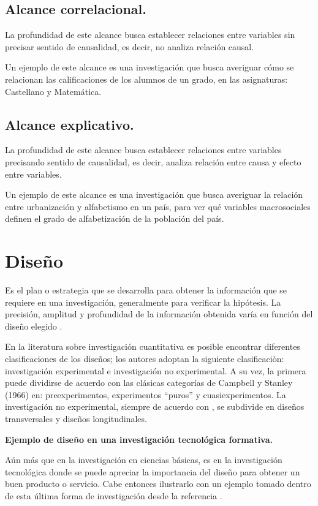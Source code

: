 \subsection{Alcance correlacional.}
La profundidad de este alcance busca establecer relaciones entre variables sin precisar sentido de causalidad, es decir, no analiza relación causal.

Un ejemplo de este alcance es una investigación que busca averiguar cómo se relacionan las calificaciones de los alumnos de un grado, en las asignaturas: Castellano y Matemática.

\subsection{Alcance explicativo.}
La profundidad de este alcance busca establecer relaciones entre variables precisando sentido de causalidad, es decir, analiza relación entre causa y efecto entre variables.

Un ejemplo de este alcance es una investigación que busca averiguar la relación entre urbanización y alfabetismo en un país, para ver qué variables macrosociales definen el grado de alfabetización de la población del país.

\section{Diseño}
Es el plan o estrategia que se desarrolla para obtener la información que se requiere en una investigación, generalmente para verificar la hipótesis. La precisión, amplitud y profundidad de la información obtenida varía en función del diseño elegido \cite{sampieri}.

En la literatura sobre investigación cuantitativa es posible encontrar diferentes clasificaciones de los diseños; los autores \cite{sampieri} adoptan la siguiente clasificaciòn: investigación experimental e investigación no experimental. A su vez, la primera puede dividirse de acuerdo con las clásicas categorías de Campbell y Stanley (1966) en: preexperimentos, experimentos ``puros'' y cuasiexperimentos. La investigación no experimental, siempre de acuerdo con \cite{sampieri}, se subdivide en diseños transversales y diseños longitudinales.

\vspace{.5 cm}

\textbf{Ejemplo de diseño en una investigación tecnológica formativa.}

Aún más que en la investigación en ciencias básicas, es en la investigación tecnológica donde se puede apreciar la importancia del diseño para obtener un buen producto o servicio. Cabe entonces ilustrarlo con un ejemplo tomado dentro de esta última forma de investigación desde la referencia \cite{lan}.

